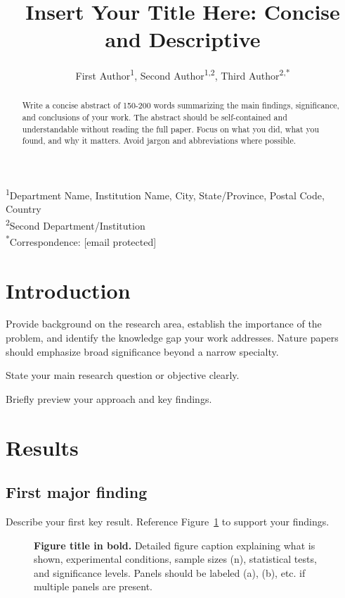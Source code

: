 \documentclass[12pt]{article}
\title{Insert Your Title Here: Concise and Descriptive}
\author{
First Author\textsuperscript{1}, Second Author\textsuperscript{1,2}, Third Author\textsuperscript{2,*}
}
\date{}
\begin{document}
\maketitle

\noindent
\textsuperscript{1}Department Name, Institution Name, City, State/Province, Postal Code, Country \\
\textsuperscript{2}Second Department/Institution \\
\textsuperscript{*}Correspondence: [email protected]

\begin{abstract}
\noindent
Write a concise abstract of 150-200 words summarizing the main findings, significance, and conclusions of your work. The abstract should be self-contained and understandable without reading the full paper. Focus on what you did, what you found, and why it matters. Avoid jargon and abbreviations where possible.
\end{abstract}

\section*{Introduction}
Provide background on the research area, establish the importance of the problem, and identify the knowledge gap your work addresses. Nature papers should emphasize broad significance beyond a narrow specialty.

State your main research question or objective clearly.

Briefly preview your approach and key findings.

\section*{Results}

\subsection*{First major finding}
Describe your first key result. Reference Figure~\ref{fig:example} to support your findings.

\begin{figure}[ht]
\centering
\caption{{\bf Figure title in bold.} Detailed figure caption explaining what is shown, experimental conditions, sample sizes (n), statistical tests, and significance levels. Panels should be labeled (a), (b), etc. if multiple panels are present.}
\label{fig:example}
\end{figure}
\end{document}
